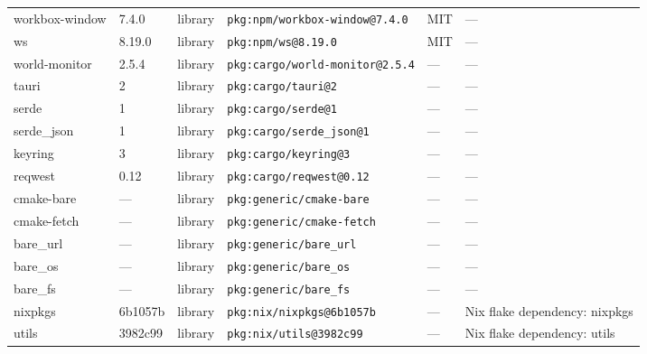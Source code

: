 \documentclass[11pt,a4paper]{article}
\begin{document}
\begin{longtable}{|p{4cm}|p{2cm}|p{1.6cm}|p{5cm}|p{1.5cm}|p{3.5cm}|}
\raggedright workbox-window & 7.4.0 & library & \small\texttt{pkg:npm/workbox-window@7.4.0} & MIT & \small — \\
\raggedright ws & 8.19.0 & library & \small\texttt{pkg:npm/ws@8.19.0} & MIT & \small — \\
\raggedright world-monitor & 2.5.4 & library & \small\texttt{pkg:cargo/world-monitor@2.5.4} & — & \small — \\
\raggedright tauri & 2 & library & \small\texttt{pkg:cargo/tauri@2} & — & \small — \\
\raggedright serde & 1 & library & \small\texttt{pkg:cargo/serde@1} & — & \small — \\
\raggedright serde\_json & 1 & library & \small\texttt{pkg:cargo/serde\_json@1} & — & \small — \\
\raggedright keyring & 3 & library & \small\texttt{pkg:cargo/keyring@3} & — & \small — \\
\raggedright reqwest & 0.12 & library & \small\texttt{pkg:cargo/reqwest@0.12} & — & \small — \\
\raggedright cmake-bare & — & library & \small\texttt{pkg:generic/cmake-bare} & — & \small — \\
\raggedright cmake-fetch & — & library & \small\texttt{pkg:generic/cmake-fetch} & — & \small — \\
\raggedright bare\_url & — & library & \small\texttt{pkg:generic/bare\_url} & — & \small — \\
\raggedright bare\_os & — & library & \small\texttt{pkg:generic/bare\_os} & — & \small — \\
\raggedright bare\_fs & — & library & \small\texttt{pkg:generic/bare\_fs} & — & \small — \\
\raggedright nixpkgs & 6b1057b & library & \small\texttt{pkg:nix/nixpkgs@6b1057b} & — & \small Nix flake dependency: nixpkgs \\
\raggedright utils & 3982c99 & library & \small\texttt{pkg:nix/utils@3982c99} & — & \small Nix flake dependency: utils \\
\end{longtable}
\end{document}
